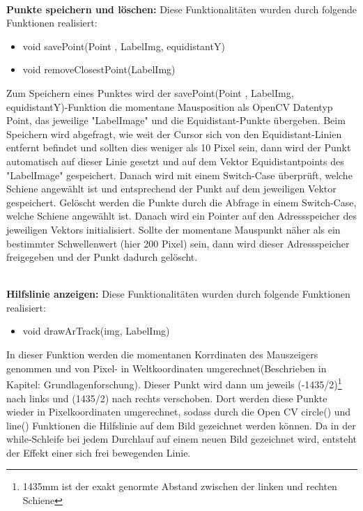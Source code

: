 \documentclass[11pt]{scrartcl}
\begin{document}
\noindent
\\
\textbf{Punkte speichern und löschen:}
\noindent
Diese Funktionalitäten wurden durch folgende Funktionen realisiert:
\begin{itemize}
	\item void savePoint(Point , LabelImg, equidistantY)
	\item void removeClosestPoint(LabelImg)
\end{itemize}

\noindent
Zum Speichern eines Punktes wird der savePoint(Point , LabelImg, equidistantY)-Funktion die momentane Mausposition als OpenCV Datentyp Point, das jeweilige "LabelImage" und die Equidistant-Punkte übergeben. Beim Speichern wird abgefragt, wie weit der Cursor sich von den Equidistant-Linien entfernt befindet und sollten dies weniger als 10 Pixel sein, dann wird der Punkt automatisch auf dieser Linie gesetzt und auf dem Vektor Equidistantpoints des "LabelImage" gespeichert. Danach wird mit einem Switch-Case überprüft, welche Schiene angewählt ist und entsprechend der Punkt auf dem jeweiligen Vektor gespeichert. Gelöscht werden die Punkte durch die Abfrage in einem Switch-Case, welche Schiene angewählt ist. Danach wird ein Pointer auf den Adressspeicher des jeweiligen Vektors initialisiert. Sollte der momentane Mauspunkt näher als ein bestimmter Schwellenwert (hier 200 Pixel) sein, dann wird dieser Adressspeicher freigegeben und der Punkt dadurch gelöscht.

\noindent
\\
\textbf{Hilfslinie anzeigen:}
\noindent
Diese Funktionalitäten wurden durch folgende Funktionen realisiert:
\begin{itemize}
	\item void drawArTrack(img, LabelImg)
\end{itemize}

\noindent
In dieser Funktion werden die momentanen Korrdinaten des Mauszeigers genommen und von Pixel- in Weltkoordinaten umgerechnet(Beschrieben in Kapitel: Grundlagenforschung). Dieser Punkt wird dann um jeweils (-1435/2)\footnote{1435mm ist der exakt genormte Abstand zwischen der linken und rechten Schiene} nach links und (1435/2) nach rechts verschoben. Dort werden diese Punkte wieder in Pixelkoordinaten umgerechnet, sodass durch die Open CV circle() und line() Funktionen die Hilfslinie auf dem Bild gezeichnet werden können. Da in der while-Schleife bei jedem Durchlauf auf einem neuen Bild gezeichnet wird, entsteht der Effekt einer sich frei bewegenden Linie.
\\
\end{document}

